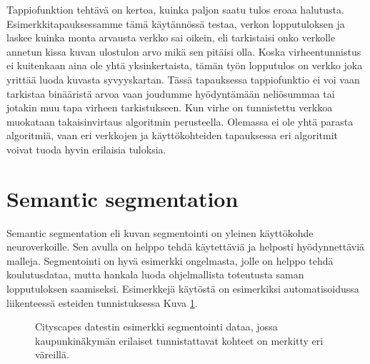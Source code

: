 Tappiofunktion tehtävä on kertoa, kuinka paljon saatu tulos eroaa halutusta.
Esimerkkitapauksessamme tämä käytännössä testaa, verkon lopputuloksen ja laskee kuinka monta arvausta verkko sai oikein,
eli tarkistaisi onko verkolle annetun kissa kuvan ulostulon arvo mikä sen pitäisi olla.
Koska virheentunnistus ei kuitenkaan aina ole yhtä yksinkertaista, tämän työn lopputulos on verkko joka yrittää luoda kuvasta syvyyskartan.
Tässä tapauksessa tappiofunktio ei voi vaan tarkistaa binääristä arvoa vaan joudumme hyödyntämään neliösummaa tai jotakin muu tapa virheen tarkistukseen.
Kun virhe on tunnistettu verkkoa muokataan takaisinvirtaus algoritmin perusteella.
Olemassa ei ole yhtä parasta algoritmiä, vaan eri verkkojen ja käyttökohteiden tapauksessa eri algoritmit voivat tuoda hyvin erilaisia tuloksia.

\section{Semantic segmentation}

Semantic segmentation eli kuvan segmentointi on yleinen käyttökohde neuroverkoille.  
Sen avulla on helppo tehdä käytettäviä ja helposti hyödynnettäviä malleja.  
Segmentointi on hyvä esimerkki ongelmasta, jolle on helppo tehdä koulutusdataa,
mutta hankala luoda ohjelmallista toteutusta saman lopputuloksen saamiseksi.  
Esimerkkejä käytöstä on esimerkiksi automatisoidussa liikenteessä esteiden tunnistuksessa Kuva \ref{fig:labels}.  

\begin{figure}[h]
\centering
{}
\caption[Tämä on lyhyt kuvateksti.]{Cityscapes datestin esimerkki segmentointi dataa, jossa kaupunkinäkymän erilaiset tunnistattavat kohteet on merkitty eri väreillä.}
\label{fig:labels}
\end{figure}

